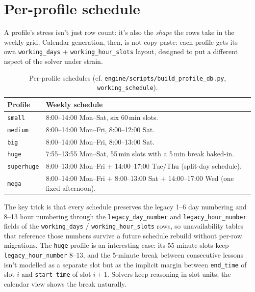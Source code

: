 \section{Per-profile schedule}

A profile's stress isn't just row count: it's also the
\emph{shape} the rows take in the weekly grid. Calendar
generation, then, is not copy-paste: each profile gets its own
\texttt{working\_days} + \texttt{working\_hour\_slots} layout,
designed to put a different aspect of the solver under strain.

\begin{table}[h]
\centering
\caption{Per-profile schedules (cf.
   \texttt{engine/scripts/build\_profile\_db.py},
   \texttt{working\_schedule}).}
\label{tab:profili_orari}
\small
\begin{tabular}{lp{8.5cm}}
\toprule
\textbf{Profile} & \textbf{Weekly schedule} \\
\midrule
\texttt{small}     & 8:00--14:00 Mon--Sat, six 60\,min slots. \\
\texttt{medium}    & 8:00--14:00 Mon--Fri, 8:00--12:00 Sat. \\
\texttt{big}       & 8:00--14:00 Mon--Fri, 8:00--13:00 Sat. \\
\texttt{huge}      & 7:55--13:55 Mon--Sat, 55\,min slots with
                     a 5\,min break baked-in. \\
\texttt{superhuge} & 8:00--13:00 Mon--Fri + 14:00--17:00 Tue/Thu
                     (split-day schedule). \\
\texttt{mega}      & 8:00--14:00 Mon--Fri + 8:00--13:00 Sat +
                     14:00--17:00 Wed (one fixed afternoon). \\
\bottomrule
\end{tabular}
\end{table}

The key trick is that every schedule preserves the legacy 1--6
day numbering and 8--13 hour numbering through the
\texttt{legacy\_day\_number} and \texttt{legacy\_hour\_number}
fields of the \texttt{working\_days} / \texttt{working\_hour\_slots}
rows, so unavailability tables that reference those numbers
survive a future schedule rebuild without per-row migrations.
The \texttt{huge} profile is an interesting case: its 55-minute
slots keep \texttt{legacy\_hour\_number} 8--13, and the 5-minute
break between consecutive lessons isn't modelled as a separate
slot but as the implicit margin between \texttt{end\_time} of
slot $i$ and \texttt{start\_time} of slot $i+1$. Solvers keep
reasoning in slot units; the calendar view shows the break
naturally.

